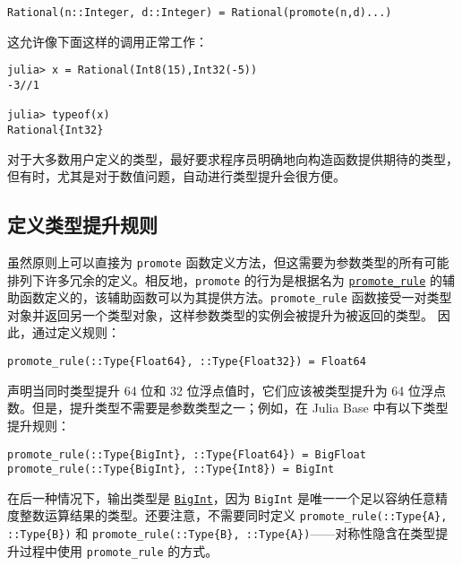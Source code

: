 \begin{verbatim}
Rational(n::Integer, d::Integer) = Rational(promote(n,d)...)
\end{verbatim}



这允许像下面这样的调用正常工作：




\begin{verbatim}
julia> x = Rational(Int8(15),Int32(-5))
-3//1

julia> typeof(x)
Rational{Int32}
\end{verbatim}



对于大多数用户定义的类型，最好要求程序员明确地向构造函数提供期待的类型，但有时，尤其是对于数值问题，自动进行类型提升会很方便。



\hypertarget{13578530399861722948}{}


\subsection{定义类型提升规则}



虽然原则上可以直接为 \texttt{promote} 函数定义方法，但这需要为参数类型的所有可能排列下许多冗余的定义。相反地，\texttt{promote} 的行为是根据名为 \hyperlink{16547112220540026290}{\texttt{promote\_rule}} 的辅助函数定义的，该辅助函数可以为其提供方法。\texttt{promote\_rule} 函数接受一对类型对象并返回另一个类型对象，这样参数类型的实例会被提升为被返回的类型。 因此，通过定义规则：




\begin{verbatim}
promote_rule(::Type{Float64}, ::Type{Float32}) = Float64
\end{verbatim}



声明当同时类型提升 64 位和 32 位浮点值时，它们应该被类型提升为 64 位浮点数。但是，提升类型不需要是参数类型之一；例如，在 Julia Base 中有以下类型提升规则：




\begin{verbatim}
promote_rule(::Type{BigInt}, ::Type{Float64}) = BigFloat
promote_rule(::Type{BigInt}, ::Type{Int8}) = BigInt
\end{verbatim}



在后一种情况下，输出类型是 \hyperlink{423405808990690832}{\texttt{BigInt}}，因为 \texttt{BigInt} 是唯一一个足以容纳任意精度整数运算结果的类型。还要注意，不需要同时定义 \texttt{promote\_rule(::Type\{A\}, ::Type\{B\})} 和 \texttt{promote\_rule(::Type\{B\}, ::Type\{A\})}——对称性隐含在类型提升过程中使用 \texttt{promote\_rule} 的方式。



